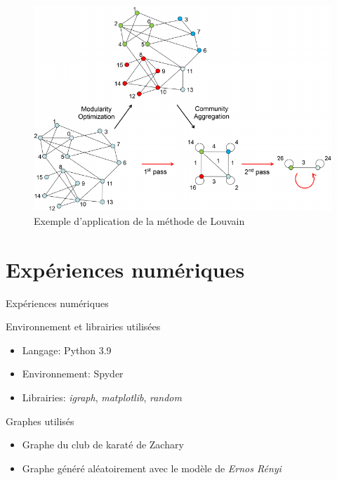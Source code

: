 \documentclass[11pt]{beamer}
\begin{document}
	\begin{frame}
		\begin{figure}[H]
			\centering
			\includegraphics[scale=0.29]{images/Louvain-algorithm-overview-Fig-1-in-10}
			\caption{Exemple d'application de la méthode de Louvain}
		\end{figure}
	\end{frame}
		
	
	\section{Expériences numériques}
	
	\begin{frame}{Expériences numériques}
		\begin{block}{Environnement et librairies utilisées}
			\begin{itemize}
				\item Langage: Python 3.9 \\
				\item Environnement: Spyder \\
				\item Librairies: \textit{igraph}, \textit{matplotlib}, \textit{random}
			\end{itemize} 
		\end{block}
		\begin{block}{Graphes utilisés}
			\begin{itemize}
				\item Graphe du club de karaté de Zachary \\
				\item Graphe généré aléatoirement avec le modèle de \textit{Ernos Rényi}
			\end{itemize}
		\end{block}
	\end{frame}
	
\end{document}
